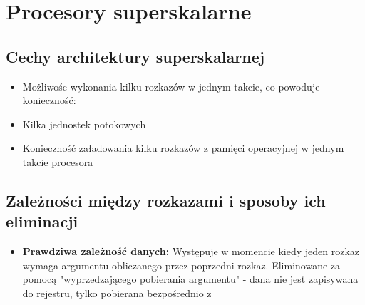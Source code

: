 \documentclass[a4paper,twoside]{article}
\begin{document}
    \section*{Procesory superskalarne}
    	\subsection*{Cechy architektury superskalarnej}
        	\begin{itemize}
            \item Możliwośc wykonania kilku rozkazów w jednym takcie, co powoduje konieczność:
            \item Kilka jednostek potokowych
            \item Konieczność załadowania kilku rozkazów z pamięci operacyjnej w jednym takcie procesora
            \end{itemize}
            
		
        \subsection*{Zależności między rozkazami i sposoby ich eliminacji}
        	\begin{itemize}
            \item \textbf{Prawdziwa zależność danych:} Występuje w momencie kiedy jeden rozkaz wymaga argumentu obliczanego przez poprzedni rozkaz. Eliminowane za pomocą "wyprzedzającego pobierania argumentu" - dana nie jest zapisywana do rejestru, tylko pobierana bezpośrednio z 
            \end{itemize}
	
\end{document}
